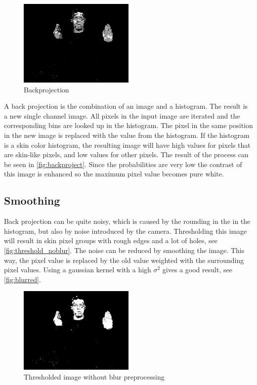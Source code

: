 \begin{figure}[htbp]
    \center{}
    \includegraphics[width=0.5\textwidth]{figures/pipeline/backproject.jpg}
 	\caption{Backprojection}
	\label{fig:backproject}
\end{figure}


A back projection is the combination of an image and a histogram. The result is a new single channel image. All pixels in the input image are iterated and the corresponding bins are looked up in the histogram. The pixel in the same position in the new image is replaced with the value from the histogram. If the histogram is a skin color histogram, the resulting image will have high values for pixels that are skin-like pixels, and low values for other pixels. The result of the process can be seen in \autoref{fig:backproject}. Since the probabilities are very low the contrast of this image is enhanced so the maximum pixel value becomes pure white.


\subsection*{Smoothing}
Back projection can be quite noisy, which is caused by the rounding in the in the histogram, but also by noise introduced by the camera. Thresholding this image will result in skin pixel groups with rough edges and a lot of holes, see \autoref{fig:threshold_noblur}. The noise can be reduced by smoothing the image. This way, the pixel value is replaced by the old value weighted with the surrounding pixel values. Using a gaussian kernel with a high $\sigma^2$ gives a good result, see \autoref{fig:blurred}.

\begin{figure}[htbp]
    \center{}
 \includegraphics[width=0.5\textwidth]{figures/pipeline/thresholded_noblur.jpg}
	\caption{Thresholded image without blur preprocessing}
	\label{fig:threshold_noblur}
\end{figure}

